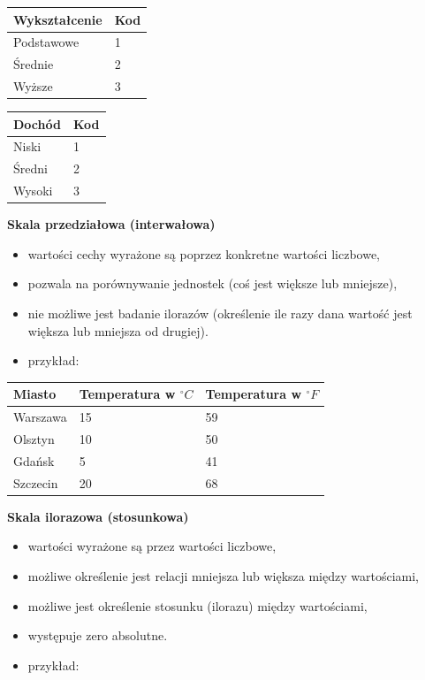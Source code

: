 \documentclass[
  letterpaper,
  DIV=11,
  numbers=noendperiod]{scrreprt}
\providecommand{\tightlist}{%
  \setlength{\itemsep}{0pt}\setlength{\parskip}{0pt}}\usepackage{longtable,booktabs,array}
\begin{document}
\begin{longtable}[]{@{}ll@{}}
\toprule\noalign{}
Wykształcenie & Kod \\
\midrule\noalign{}
\endhead
\bottomrule\noalign{}
\endlastfoot
Podstawowe & 1 \\
Średnie & 2 \\
Wyższe & 3 \\
\end{longtable}

\begin{longtable}[]{@{}ll@{}}
\toprule\noalign{}
Dochód & Kod \\
\midrule\noalign{}
\endhead
\bottomrule\noalign{}
\endlastfoot
Niski & 1 \\
Średni & 2 \\
Wysoki & 3 \\
\end{longtable}

\textbf{Skala przedziałowa (interwałowa)}

\begin{itemize}
\tightlist
\item
  wartości cechy wyrażone są poprzez konkretne wartości liczbowe,
\item
  pozwala na porównywanie jednostek (coś jest większe lub mniejsze),
\item
  nie możliwe jest badanie ilorazów (określenie ile razy dana wartość
  jest większa lub mniejsza od drugiej).
\item
  przykład:
\end{itemize}

\begin{longtable}[]{@{}lll@{}}
\toprule\noalign{}
Miasto & Temperatura w \(^{\circ}C\) & Temperatura w \(^{\circ}F\) \\
\midrule\noalign{}
\endhead
\bottomrule\noalign{}
\endlastfoot
Warszawa & 15 & 59 \\
Olsztyn & 10 & 50 \\
Gdańsk & 5 & 41 \\
Szczecin & 20 & 68 \\
\end{longtable}

\textbf{Skala ilorazowa (stosunkowa)}

\begin{itemize}
\tightlist
\item
  wartości wyrażone są przez wartości liczbowe,
\item
  możliwe określenie jest relacji mniejsza lub większa między
  wartościami,
\item
  możliwe jest określenie stosunku (ilorazu) między wartościami,
\item
  występuje zero absolutne.
\item
  przykład:
\end{itemize}
\end{document}
